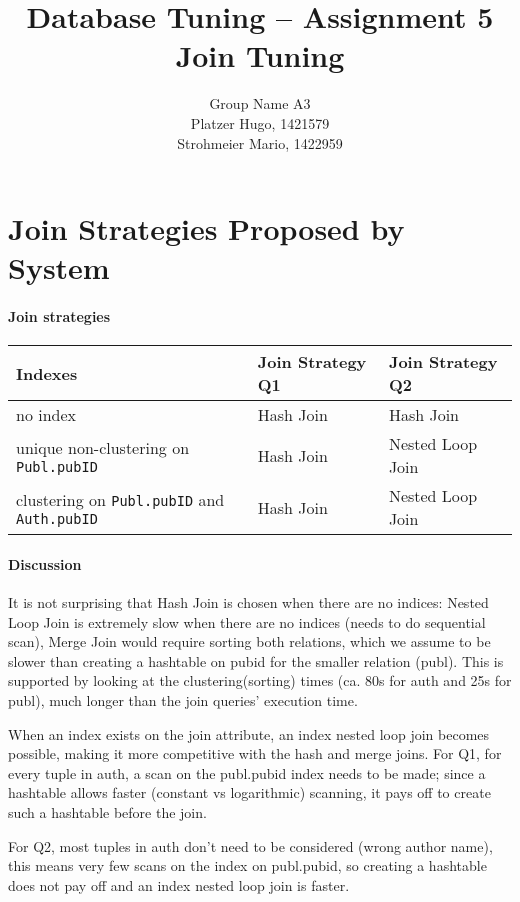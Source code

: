 \documentclass[11pt]{scrartcl}
\title{
  \textbf{\large Database Tuning -- Assignment 5}\\
  Join Tuning
}
\author{
 Group Name A3\\
 \large Platzer Hugo, 1421579 \\
 \large Strohmeier Mario, 1422959
}
\begin{document}
\maketitle

\section{Join Strategies Proposed by System}

\paragraph{Join strategies}

\begin{flushleft}
\begin{tabular}{l|l|l}
  Indexes & Join Strategy Q1 & Join Strategy Q2\\
  \hline
  no index & Hash Join & Hash Join  \\
  unique non-clustering on {\tt Publ.pubID} & Hash Join  & Nested Loop Join \\
  clustering on {\tt Publ.pubID} and {\tt Auth.pubID} & Hash Join & Nested Loop Join \\
\end{tabular}
\end{flushleft}

\paragraph{Discussion}
It is not surprising that Hash Join is chosen when there are no indices: Nested Loop Join
is extremely slow when there are no indices (needs to do sequential scan), Merge Join would
require sorting both relations, which we assume to be slower than creating a hashtable on pubid
for the smaller relation (publ). This is supported by looking at the clustering(sorting) times
(ca. 80s for auth and 25s for publ), much longer than the join queries' execution time.

When an index exists on the join attribute, an index nested loop join becomes possible, making
it more competitive with the hash and merge joins. For Q1, for every tuple in auth, a scan on
the publ.pubid index needs to be made; since a hashtable allows faster (constant vs logarithmic) scanning,
it pays off to create such a hashtable before the join.

For Q2, most tuples in auth don't need to be considered (wrong author name), this means very few
scans on the index on publ.pubid, so creating a hashtable does not pay off and an index nested loop
join is faster.
\end{document}
